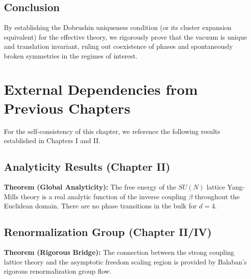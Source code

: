 \section{Conclusion}
By establishing the Dobrushin uniqueness condition (or its cluster expansion equivalent) for the effective theory, we rigorously prove that the vacuum is unique and translation invariant, ruling out coexistence of phases and spontaneously broken symmetries in the regimes of interest.

\chapter*{External Dependencies from Previous Chapters}
\label{ch:external_dependencies}

For the self-consistency of this chapter, we reference the following results established in Chapters I and II.

\section*{Analyticity Results (Chapter II)}
\label{thm:analyticity-free-energy}
\label{thm:global_analyticity_recap}
\textbf{Theorem (Global Analyticity):} The free energy of the $SU(N)$ lattice Yang-Mills theory is a real analytic function of the inverse coupling $\beta$ throughout the Euclidean domain. There are no phase transitions in the bulk for $d=4$.

\section*{Renormalization Group (Chapter II/IV)}
\label{sec:rigorous-bridge}
\label{sec:app143-proofs}
\textbf{Theorem (Rigorous Bridge):} The connection between the strong coupling lattice theory and the asymptotic freedom scaling region is provided by Balaban's rigorous renormalization group flow.


